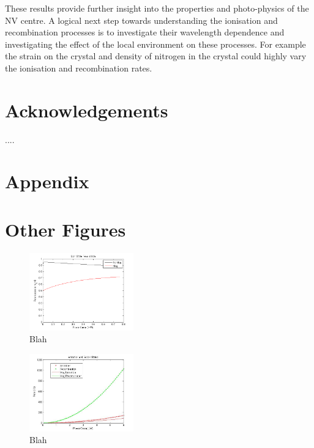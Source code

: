 \documentclass[prl]{revtex4}
\begin{document}
These results provide further insight into the properties and photo-physics of the NV centre. A logical next step towards understanding the ionisation and recombination processes is to investigate their wavelength dependence and investigating the effect of the local environment on these processes. For example the strain on the crystal and density of nitrogen in the crystal could highly vary the ionisation and recombination rates.


\section*{Acknowledgements}

....

%
\appendix
\section{Appendix}

\section{Other Figures}

\begin{figure}[H]
  \centering
  \includegraphics[width=0.4\textwidth]{SpinData.png} 
 \caption{Blah} 
\end{figure}

\begin{figure}[H]
  \centering
  \includegraphics[width=0.4\textwidth]{IonAndRecom.jpg} 
 \caption{Blah} 
\end{figure}
\end{document}
